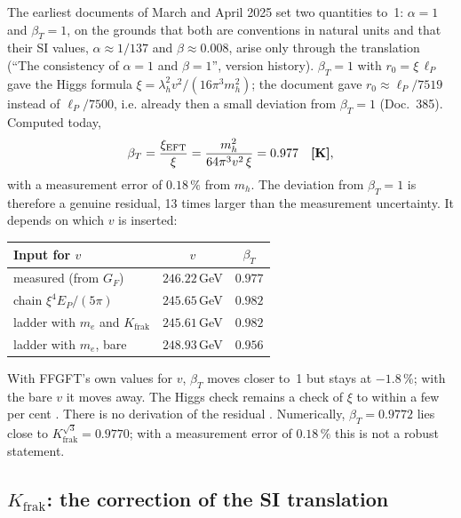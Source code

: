 The earliest documents of March and April 2025 set two quantities to~1: $\alpha=1$ and
$\beta_T=1$, on the grounds that both are conventions in natural units and that their SI values,
$\alpha\approx1/137$ and $\beta\approx0.008$, arise only through the translation (``The consistency
of $\alpha=1$ and $\beta=1$'', version history). $\beta_T=1$ with $r_0=\xi\,\ell_P$ gave the Higgs
formula $\xi=\lambda_h^2v^2/(16\pi^3m_h^2)$; the document gave $r_0\approx\ell_P/7519$ instead of
$\ell_P/7500$, i.e. already then a small deviation from $\beta_T=1$ (Doc.~385). Computed today,
\begin{equation}
  \beta_T=\frac{\xi_{\text{EFT}}}{\xi}=\frac{m_h^2}{64\pi^3v^2\,\xi}=0.977\quad\textbf{[K]} ,
\end{equation}
with a measurement error of $0.18\,\%$ from $m_h$. The deviation from $\beta_T=1$ is therefore a
genuine residual, 13 times larger than the measurement uncertainty. It depends on which $v$ is
inserted:
\begin{center}
\small
\begin{tabular}{@{}lcc@{}}
\toprule
\textbf{Input for $v$} & $v$ & $\beta_T$ \\
\midrule
measured (from $G_F$) & $246.22$\,GeV & $0.977$ \\
chain $\xi^4E_P/(5\pi)$ & $245.65$\,GeV & $0.982$ \\
ladder with $m_e$ and $K_{\text{frak}}$ & $245.61$\,GeV & $0.982$ \\
ladder with $m_e$, bare & $248.93$\,GeV & $0.956$ \\
\bottomrule
\end{tabular}
\end{center}
With FFGFT's own values for $v$, $\beta_T$ moves closer to~1 but stays at $-1.8\,\%$; with the bare
$v$ it moves away. The Higgs check remains a check of $\xi$ to within a few per cent \KM. There is
no derivation of the residual \SM. Numerically, $\beta_T=0.9772$ lies close to
$K_{\text{frak}}^{\sqrt3}=0.9770$; with a measurement error of $0.18\,\%$ this is not a robust
statement.

\subsection{\texorpdfstring{$K_{\text{frak}}$}{K\_frak}: the correction of the SI translation}

